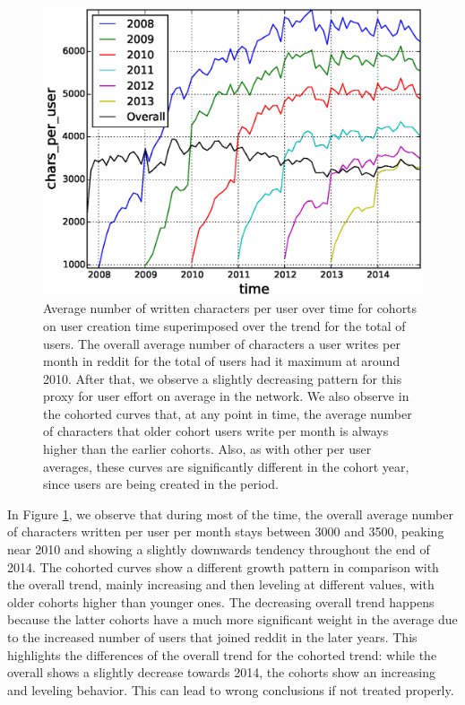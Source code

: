 \begin{figure}[!tb]
\centering
\includegraphics[scale=0.4]{./images/avr_comment_size_user_over_time_cohorts.eps}
\caption{Average number of written characters per user over time for cohorts on user creation time superimposed over the trend for the total of users. The overall average number of characters a user writes per month in reddit for the total of users had it maximum at around 2010. After that, we observe a slightly decreasing pattern for this proxy for user effort on average in the network. We also observe in the cohorted curves that, at any point in time, the average number of characters that older cohort users write per month is always higher than the earlier cohorts. Also, as with other per user averages, these curves are significantly different in the cohort year, since users are being created in the period.}
\label{fig:avr_comment_size_user_over_time_cohorts}
\end{figure}

In Figure \ref{fig:avr_comment_size_user_over_time_cohorts}, we observe that during most of the time, the overall average number of characters written per user per month stays between 3000 and 3500, peaking near 2010 and showing a slightly downwards tendency throughout the end of 2014. The cohorted curves show a different growth pattern in comparison with the overall trend, mainly increasing and then leveling at different values, with older cohorts higher than younger ones. The decreasing overall trend happens because the latter cohorts have a much more significant weight in the average due to the increased number of users that joined reddit in the later years. This highlights the differences of the overall trend for the cohorted trend: while the overall shows a slightly decrease towards 2014, the cohorts show an increasing and leveling behavior. This can lead to wrong conclusions if not treated properly.

